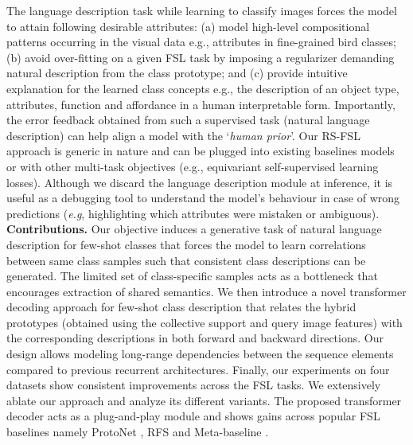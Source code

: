 \documentclass{bmvc2k}
\def\eg{\emph{e.g}\bmvaOneDot}
\begin{document}
The language description task while learning to classify images forces the model to attain following desirable attributes: (a) model high-level compositional patterns occurring in the visual data e.g., attributes in fine-grained bird classes; (b) avoid over-fitting on a given FSL task by imposing a regularizer demanding natural description from the class prototype; and (c) provide intuitive explanation for the learned class concepts e.g., the description of an object type, attributes, function and affordance in a human interpretable form. Importantly, the error feedback obtained from such a supervised task (natural language description) can help align a model with the `\emph{human prior}’. Our RS-FSL approach is generic in nature and can be plugged into existing baselines models or with other multi-task objectives (e.g., equivariant self-supervised learning losses). Although we discard the language description module at inference, it is useful as a debugging tool to understand the model's behaviour in case of wrong predictions (\eg, highlighting which attributes were mistaken or ambiguous).\\

\noindent \textbf{Contributions.} Our objective induces a generative task of natural language description for few-shot classes that forces the model to learn correlations between same class samples such that consistent class descriptions can be generated. The limited set of class-specific samples acts as a bottleneck that encourages extraction of shared semantics. We then introduce a novel transformer decoding approach for few-shot class description that relates the hybrid prototypes (obtained using the collective support and query image features) with the corresponding descriptions in both forward and backward directions. Our design allows modeling long-range dependencies between the sequence elements compared to previous recurrent architectures. Finally, our experiments on four datasets show consistent improvements across the FSL tasks. We extensively ablate our approach and analyze its different variants. The proposed transformer decoder acts as a plug-and-play module and shows gains across popular FSL baselines namely ProtoNet \cite{snell2017prototypical}, RFS \cite{RFS} and Meta-baseline \cite{chen2020new}. 
\end{document}

